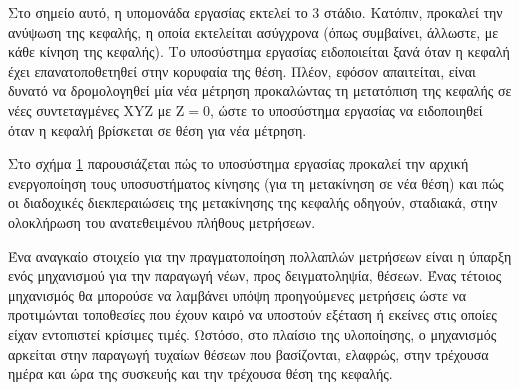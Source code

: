 Στο σημείο αυτό, η υπομονάδα εργασίας εκτελεί το 3 στάδιο. Κατόπιν,
προκαλεί την ανύψωση της κεφαλής, η οποία εκτελείται ασύγχρονα (όπως συμβαίνει,
άλλωστε, με κάθε κίνηση της κεφαλής). Το υποσύστημα εργασίας ειδοποιείται ξανά
όταν η κεφαλή έχει επανατοποθετηθεί στην κορυφαία της θέση. Πλέον, εφόσον
απαιτείται, είναι δυνατό να δρομολογηθεί μία νέα μέτρηση προκαλώντας τη
μετατόπιση της κεφαλής σε νέες συντεταγμένες XYZ με $\text{Z} = 0$, ώστε το
υποσύστημα εργασίας να ειδοποιηθεί όταν η κεφαλή βρίσκεται σε θέση για νέα
μέτρηση.

Στο σχήμα \ref{fig:task:samples} παρουσιάζεται πώς το υποσύστημα εργασίας
προκαλεί την αρχική ενεργοποίηση τους υποσυστήματος κίνησης (για τη μετακίνηση
σε νέα θέση) και πώς οι διαδοχικές διεκπεραιώσεις της μετακίνησης της κεφαλής
οδηγούν, σταδιακά, στην ολοκλήρωση του ανατεθειμένου πλήθους μετρήσεων.

\begin{figure}
    \caption{
    \label{fig:task:samples}}
\end{figure}

Ένα αναγκαίο στοιχείο για την πραγματοποίηση πολλαπλών μετρήσεων είναι η ύπαρξη
ενός μηχανισμού για την παραγωγή νέων, προς δειγματοληψία, θέσεων. Ένας τέτοιος
μηχανισμός θα μπορούσε να λαμβάνει υπόψη προηγούμενες μετρήσεις ώστε να
προτιμώνται τοποθεσίες που έχουν καιρό να υποστούν εξέταση ή εκείνες στις οποίες
είχαν εντοπιστεί κρίσιμες τιμές. Ωστόσο, στο πλαίσιο της υλοποίησης, ο
μηχανισμός αρκείται στην παραγωγή τυχαίων θέσεων που βασίζονται, ελαφρώς, στην
τρέχουσα ημέρα και ώρα της συσκευής
και την τρέχουσα θέση της κεφαλής.

